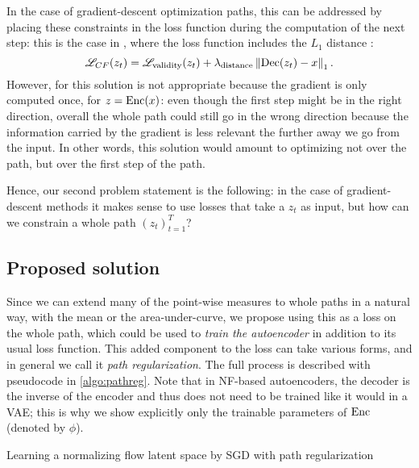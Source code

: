 \documentclass[../main.tex]{subfiles}
\begin{document}
In the case of gradient-descent optimization paths, this can be addressed by placing these constraints in the loss function during the computation of the next step: this is the case in \revise{}, where the loss function includes the $L_1$ distance \cite{joshiRealistic2019}:
\begin{equation*}
    \mathscr{L}_{CF}(z_t) = \mathscr{L}_\text{validity}(z_t) + \lambda_\text{distance} \left\lVert\operatorname{Dec}(z_t) - x\right\rVert_1.
\end{equation*}
However, for \ls{} this solution is not appropriate because the gradient is only computed once, for $z = \operatorname{Enc}(x)$: even though the first step might be in the right direction, overall the whole path could still go in the wrong direction because the information carried by the gradient is less relevant the further away we go from the input.
In other words, this solution would amount to optimizing not over the path, but over the first step of the path.

Hence, our second problem statement is the following: in the case of gradient-descent methods it makes sense to use losses that take a $z_t$ as input, but how can we constrain a whole path $(z_t)_{t=1}^T$?

\subsection{Proposed solution}

Since we can extend many of the point-wise measures to whole paths in a natural way, \eg{} with the mean or the area-under-curve, we propose using this as a loss on the whole path, which could be used to \emph{train the autoencoder} in addition to its usual loss function.
This added component to the loss can take various forms, and in general we call it \emph{path regularization}. The full process is described with pseudocode in \autoref{algo:pathreg}.
Note that in NF-based autoencoders, the decoder is the inverse of the encoder and thus does not need to be trained like it would in a VAE; this is why we show explicitly only the trainable parameters of $\operatorname{Enc}$ (denoted by $\phi$).

\begin{algorithm}
\caption{Learning a normalizing flow latent space by SGD with path regularization}
\label{algo:pathreg}
\end{algorithm}
\end{document}
